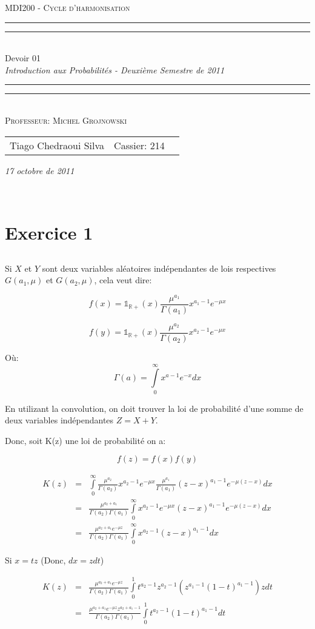 \documentclass[a4paper]{article}
\date{Octobre 17, 2011}
\newcommand*{\titleTMB}{\begingroup \centering \settowidth{\unitlength}{\LARGE EE531} {\large\scshape MDI200 - Cycle d'harmonisation }\\[0.2\baselineskip] \rule{11.0cm}{1.6pt}\vspace*{-\baselineskip}\vspace*{2pt} \rule{11.0cm}{0.4pt}\\[\baselineskip] {\LARGE Devoir 01}\\\vspace*{\baselineskip}  {\itshape Introduction aux Probabilités - Deuxième Semestre de 2011}\\ \rule{11.0cm}{0.4pt}\vspace*{-\baselineskip}\vspace{3.2pt} \rule{11.0cm}{1.6pt}\\[\baselineskip] {\large\scshape Professeur: Michel Grojnowski}\par \vfill {\normalsize   \scshape 
    \begin{center} 
      \begin{tabular}{  l  l  p{5cm} } 
        Tiago Chedraoui Silva  & Cassier: 214\\
      \end{tabular} \end{center}
    \itshape 17 octobre de 2011    }\\[\baselineskip] \vspace{3.2pt} \endgroup}
\begin{document}
\titleTMB 
\newpage

\section{Exercice 1}

\subsection{}
Si $X$ et $Y$ sont deux variables aléatoires indépendantes de lois respectives $G(a_1,\mu)$ et $G(a_2,\mu)$, cela veut dire:

\begin{equation}
f(x)=\mathds{1}_{\mathbb{R}+}(x)\frac{\mu^{a_1}}{\Gamma (a_1)}x^{a_1-1}e^{-\mu x}
\end{equation}

\begin{equation}
f(y)=\mathds{1}_{\mathbb{R}+}(x)\frac{\mu^{a_2}}{\Gamma (a_2)}x^{a_2-1}e^{-\mu x}
\end{equation}

Où:
\begin{equation}
\Gamma \left( a \right) = \int\limits_0^\infty {x^{a - 1} } e^{ - x} dx  
\end{equation}

En utilizant la convolution, on doit trouver la loi de probabilité d'une somme de deux variables indépendantes $Z = X + Y$. 

Donc, soit K(z) une loi de probabilité on a:

\begin{equation}
f(z)=f(x)f(y)
\end{equation}

\begin{eqnarray*}
K(z) &=& \int\limits_0^\infty\frac{\mu^{a_2}}{\Gamma (a_2)}x^{a_2-1}e^{-\mu x} \frac{\mu^{a_1}}{\Gamma (a_1)}(z-x)^{a_1-1}e^{-\mu (z-x)}dx\\
&=&\frac{\mu^{a_2+a_1}}{\Gamma (a_2)\Gamma (a_1)}\int\limits_0^\infty{x^{a_2-1}e^{-\mu x} }(z-x)^{a_1-1}e^{-\mu (z-x)}dx\\
&=&\frac{\mu^{a_2+a_1}e^{-\mu z}}{\Gamma (a_2)\Gamma (a_1)}\int\limits_0^\infty{x^{a_2-1}}(z-x)^{a_1-1}dx
\end{eqnarray*}

Si $x = tz$ (Donc, $dx = zdt$)

\begin{eqnarray*}
K(z)&=&\frac{\mu^{a_2+a_1}e^{-\mu z}}{\Gamma (a_2)\Gamma (a_1)}\int\limits_0^1{t^{a_2-1}z^{a_2-1}}(z^{a_1-1}(1-t)^{a_1-1})zdt\\
&=&\frac{\mu^{a_2+a_1}e^{-\mu z}z^{a_2+a_1-1}}{\Gamma (a_2)\Gamma (a_1)}\int\limits_0^1{t^{a_2-1}}(1-t)^{a_1-1}dt
\end{eqnarray*}
\end{document}
